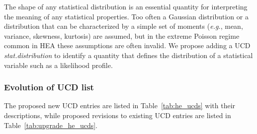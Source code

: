 \documentclass[11pt,a4paper]{ivoa}
\begin{document}
The shape of any statistical distribution is an essential quantity for interpreting the meaning of any statistical properties.  Too often a Gaussian distribution or a distribution that can be characterized by a simple set of moments ({\em e.g.\/}, mean, variance, skewness, kurtosis) are assumed, but in the extreme Poisson regime common in \gls{HEA} these assumptions are often invalid.  We propose adding a UCD {\em stat.distribution\/} to identify a quantity that defines the distribution of a statistical variable such as  a likelihood profile.

\subsubsection{Evolution of UCD list}

The proposed new UCD entries are listed in Table~\ref{tab:he_ucds} with their descriptions, while proposed revisions to existing UCD entries are  listed in Table~\ref{tab:upgrade_he_ucds}.
\end{document}
